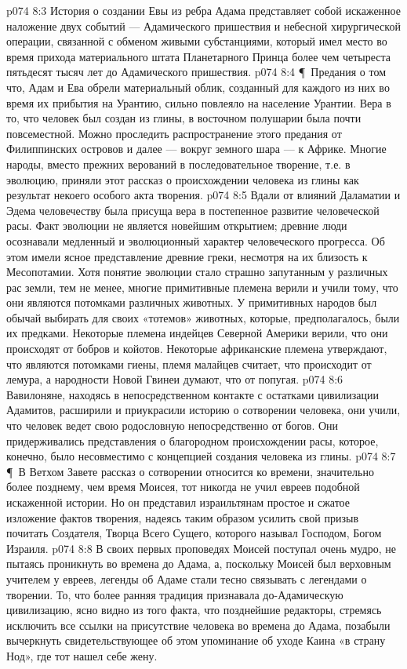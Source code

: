 \vs p074 8:3 История о создании Евы из ребра Адама представляет собой искаженное наложение двух событий --- Адамического пришествия и небесной хирургической операции, связанной с обменом живыми субстанциями, который имел место во время прихода материального штата Планетарного Принца более чем четыреста пятьдесят тысяч лет до Адамического пришествия.
\vs p074 8:4 \P\ Предания о том что, Адам и Ева обрели материальный облик, созданный для каждого из них во время их прибытия на Урантию, сильно повлеяло на население Урантии. Вера в то, что человек был создан из глины, в восточном полушарии была почти повсеместной. Можно проследить распространение этого предания от Филиппинских островов и далее --- вокруг земного шара --- к Африке. Многие народы, вместо прежних верований в последовательное творение, т.е. в эволюцию, приняли этот рассказ о происхождении человека из глины как результат некоего особого акта творения.
\vs p074 8:5 Вдали от влияний Даламатии и Эдема человечеству была присуща вера в постепенное развитие человеческой расы. Факт эволюции не является новейшим открытием; древние люди осознавали медленный и эволюционный характер человеческого прогресса. Об этом имели ясное представление древние греки, несмотря на их близость к Месопотамии. Хотя понятие эволюции стало страшно запутанным у различных рас земли, тем не менее, многие примитивные племена верили и учили тому, что они являются потомками различных животных. У примитивных народов был обычай выбирать для своих «тотемов» животных, которые, предполагалось, были их предками. Некоторые племена индейцев Северной Америки верили, что они происходят от бобров и койотов. Некоторые африканские племена утверждают, что являются потомками гиены, племя малайцев считает, что происходит от лемура, а народности Новой Гвинеи думают, что от попугая.
\vs p074 8:6 Вавилоняне, находясь в непосредственном контакте с остатками цивилизации Адамитов, расширили и приукрасили историю о сотворении человека, они учили, что человек ведет свою родословную непосредственно от богов. Они придерживались представления о благородном происхождении расы, которое, конечно, было несовместимо с концепцией создания человека из глины.
\vs p074 8:7 \P\ В Ветхом Завете рассказ о сотворении относится ко времени, значительно более позднему, чем время Моисея, тот никогда не учил евреев подобной искаженной истории. Но он представил израильтянам простое и сжатое изложение фактов творения, надеясь таким образом усилить свой призыв почитать Создателя, Творца Всего Сущего, которого называл Господом, Богом Израиля.
\vs p074 8:8 В своих первых проповедях Моисей поступал очень мудро, не пытаясь проникнуть во времена до Адама, а, поскольку Моисей был верховным учителем у евреев, легенды об Адаме стали тесно связывать с легендами о творении. То, что более ранняя традиция признавала до\hyp{}Адамическую цивилизацию, ясно видно из того факта, что позднейшие редакторы, стремясь исключить все ссылки на присутствие человека во времена до Адама, позабыли вычеркнуть свидетельствующее об этом упоминание об уходе Каина «в страну Нод», где тот нашел себе жену.
